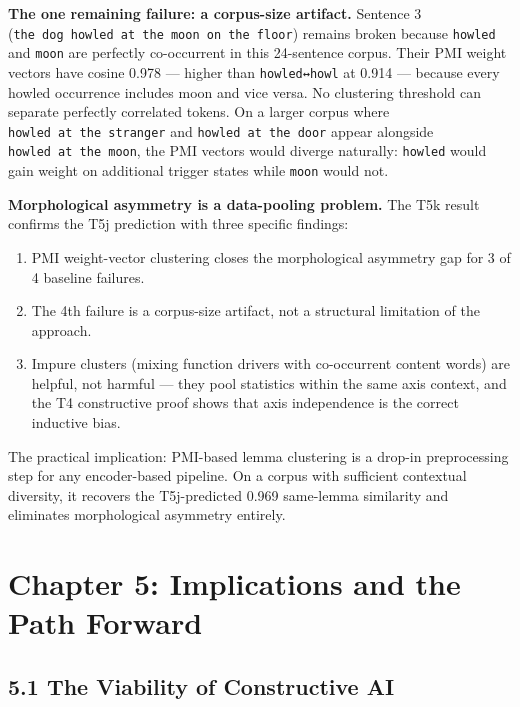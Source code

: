 \documentclass[
  twocolumn,
  10pt,
  a4paper]{article}
\providecommand{\tightlist}{%
  \setlength{\itemsep}{0pt}\setlength{\parskip}{0pt}}
\begin{document}
\textbf{The one remaining failure: a corpus-size artifact.} Sentence 3
(\texttt{the\ dog\ howled\ at\ the\ moon\ on\ the\ floor}) remains
broken because \texttt{howled} and \texttt{moon} are perfectly
co-occurrent in this 24-sentence corpus. Their PMI weight vectors have
cosine 0.978 --- higher than \texttt{howled↔howl} at 0.914 --- because
every howled occurrence includes moon and vice versa. No clustering
threshold can separate perfectly correlated tokens. On a larger corpus
where \texttt{howled\ at\ the\ stranger} and
\texttt{howled\ at\ the\ door} appear alongside
\texttt{howled\ at\ the\ moon}, the PMI vectors would diverge naturally:
\texttt{howled} would gain weight on additional trigger states while
\texttt{moon} would not.

\textbf{Morphological asymmetry is a data-pooling problem.} The T5k
result confirms the T5j prediction with three specific findings:

\begin{enumerate}
\def\labelenumi{\arabic{enumi}.}
\tightlist
\item
  PMI weight-vector clustering closes the morphological asymmetry gap
  for 3 of 4 baseline failures.
\item
  The 4th failure is a corpus-size artifact, not a structural limitation
  of the approach.
\item
  Impure clusters (mixing function drivers with co-occurrent content
  words) are helpful, not harmful --- they pool statistics within the
  same axis context, and the T4 constructive proof shows that axis
  independence is the correct inductive bias.
\end{enumerate}

The practical implication: PMI-based lemma clustering is a drop-in
preprocessing step for any encoder-based pipeline. On a corpus with
sufficient contextual diversity, it recovers the T5j-predicted 0.969
same-lemma similarity and eliminates morphological asymmetry entirely.

\hypertarget{chapter-5-implications-and-the-path-forward}{%
\FloatBarrier
\section{Chapter 5: Implications and the Path
Forward}\label{chapter-5-implications-and-the-path-forward}}

\hypertarget{the-viability-of-constructive-ai}{%
\subsection{5.1 The Viability of Constructive
AI}\label{the-viability-of-constructive-ai}}
\end{document}
